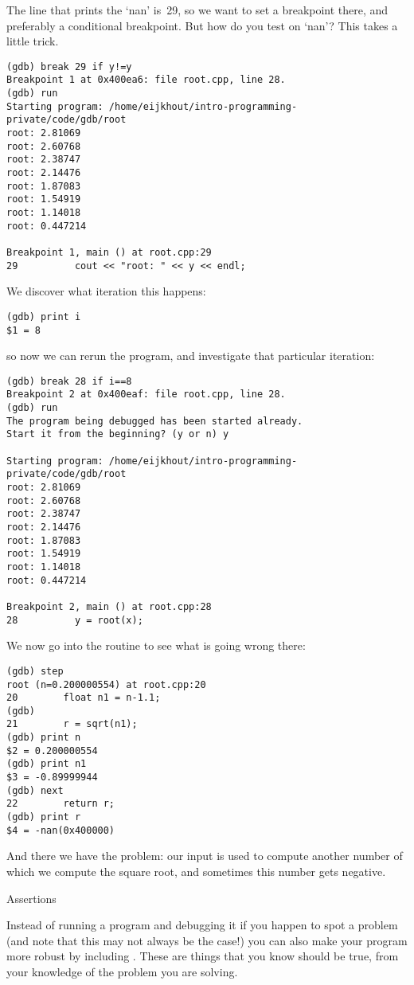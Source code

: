 The line that prints the `nan' is~29, so we want to set a breakpoint there,
and preferably a conditional breakpoint.
But how do you test on `nan'? This takes a little trick.
\begin{verbatim}
(gdb) break 29 if y!=y
Breakpoint 1 at 0x400ea6: file root.cpp, line 28.
(gdb) run
Starting program: /home/eijkhout/intro-programming-private/code/gdb/root
root: 2.81069
root: 2.60768
root: 2.38747
root: 2.14476
root: 1.87083
root: 1.54919
root: 1.14018
root: 0.447214

Breakpoint 1, main () at root.cpp:29
29          cout << "root: " << y << endl;
\end{verbatim}
We discover what iteration this happens:
\begin{verbatim}
(gdb) print i
$1 = 8
\end{verbatim}
so now we can rerun the program, and investigate that particular iteration:
\begin{verbatim}
(gdb) break 28 if i==8
Breakpoint 2 at 0x400eaf: file root.cpp, line 28.
(gdb) run
The program being debugged has been started already.
Start it from the beginning? (y or n) y

Starting program: /home/eijkhout/intro-programming-private/code/gdb/root
root: 2.81069
root: 2.60768
root: 2.38747
root: 2.14476
root: 1.87083
root: 1.54919
root: 1.14018
root: 0.447214

Breakpoint 2, main () at root.cpp:28
28          y = root(x);
\end{verbatim}
We now go into the  routine to see what is going wrong there:
\begin{verbatim}
(gdb) step
root (n=0.200000554) at root.cpp:20
20        float n1 = n-1.1;
(gdb)
21        r = sqrt(n1);
(gdb) print n
$2 = 0.200000554
(gdb) print n1
$3 = -0.89999944
(gdb) next
22        return r;
(gdb) print r
$4 = -nan(0x400000)
\end{verbatim}
And there we have the problem: our input  is used to compute
another number  of which we compute the square root,
and sometimes this number gets negative.

 {Assertions}

Instead of running a program and debugging it if you happen to spot a problem
(and note that this may not always be the case!)
you can also make your program more robust by including .
These are things that you know should be true,
from your knowledge of the problem you are solving.

